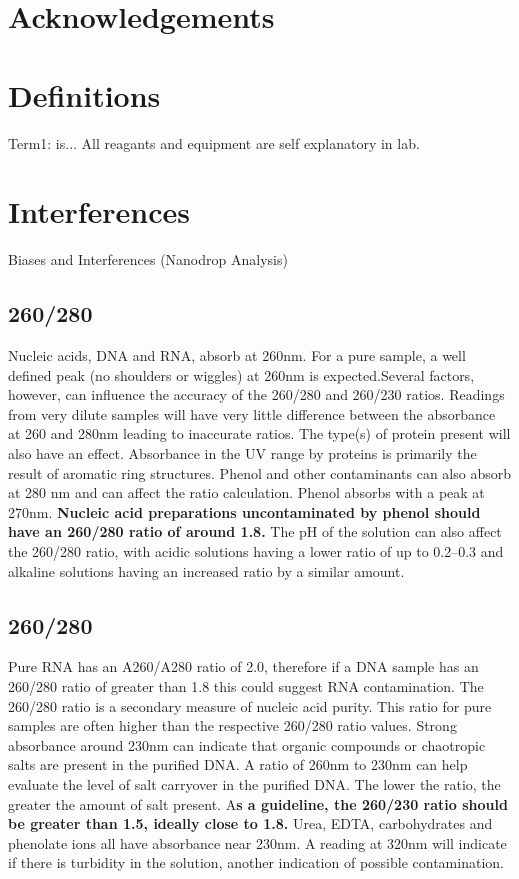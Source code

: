 \documentclass[12pt]{../SOP3_alpha}
\begin{document}
\tableofcontents

\newpage

\section{Acknowledgements}

\section{Definitions}

\NP Term1: is... All reagants and equipment are self explanatory in lab. 

\section{Interferences}

\NP Biases and Interferences (Nanodrop Analysis) 

\subsection {260/280} Nucleic acids, DNA and RNA, absorb at 260nm. For a pure sample, a well defined peak (no shoulders or wiggles) at 260nm is expected.Several factors, however, can influence the accuracy of the 260/280 and 260/230 ratios. Readings from very dilute samples will have very little difference between the absorbance at 260 and 280nm leading to inaccurate ratios.  The type(s) of protein present will also have an effect.  Absorbance in the UV range by proteins is primarily the result of aromatic ring structures. Phenol and other contaminants can also absorb at 280 nm and can affect the ratio calculation. Phenol absorbs with a peak at 270nm. \textbf{Nucleic acid preparations uncontaminated by phenol should have an 260/280 ratio of around 1.8. } The pH of the solution can also affect the 260/280 ratio, with acidic solutions having a lower ratio of up to 0.2–0.3 and alkaline solutions having an increased ratio by a similar amount.

\subsection {260/280}Pure RNA has an A260/A280 ratio of 2.0, therefore if a DNA sample has an 260/280 ratio of greater than 1.8 this could suggest RNA contamination. The 260/280 ratio is a secondary measure of nucleic acid purity. This ratio for pure samples are often higher than the respective 260/280 ratio values. Strong absorbance around 230nm can indicate that organic compounds or chaotropic salts are present in the purified DNA.  A ratio of 260nm to 230nm can help evaluate the level of salt carryover in the purified DNA. The lower the ratio, the greater the amount of salt present. A\textbf{s a guideline, the 260/230 ratio should be greater than 1.5, ideally close to 1.8. } Urea, EDTA, carbohydrates and phenolate ions all have absorbance near 230nm. A reading at 320nm will indicate if there is turbidity in the solution, another indication of possible contamination. 
\end{document}
